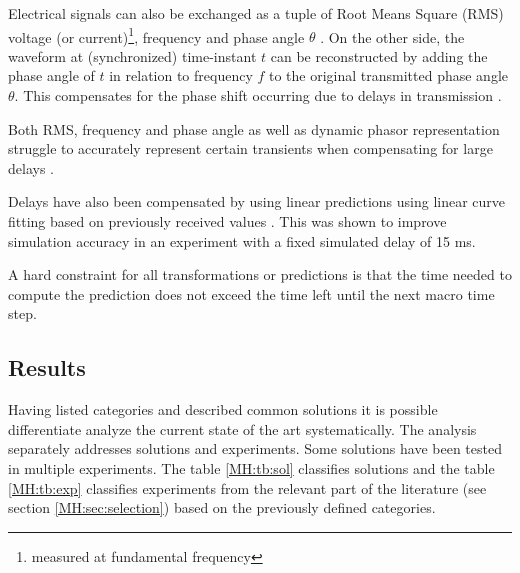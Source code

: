 \documentclass[a4paper,ngerman]{atseminar}
\begin{document}
Electrical signals can also be exchanged as a tuple of Root Means Square (RMS) voltage (or current)\footnote{measured at fundamental frequency}, frequency and phase angle  $\theta$ \cite{stevic2017fidelity}. On the other side, the waveform at (synchronized) time-instant $t$ can be reconstructed by adding the phase angle of $t$ in relation to frequency $f$ to the original transmitted phase angle $\theta$. This compensates for the phase shift occurring due to delays in transmission \cite{stevic2017fidelity}. 


Both RMS, frequency and phase angle as well as dynamic phasor representation struggle to accurately represent certain transients when compensating for large delays \cite{stevic2017fidelity}.


Delays have also been compensated by using linear predictions using linear curve fitting based on previously received values \cite{liu2016}. This was shown to improve simulation accuracy in an experiment with a fixed simulated delay of 15 ms.

A hard constraint for all transformations or predictions is that the time needed to compute the prediction does not exceed the time left until the next macro time step.



\subsection{Results}
\label{MH:sec:results}

Having listed categories and described common solutions it is possible differentiate analyze the current state of the art systematically. The analysis separately addresses solutions and experiments. Some solutions have been tested in multiple experiments. The table \ref{MH:tb:sol} classifies solutions and the table \ref{MH:tb:exp} classifies experiments from the relevant part of the literature (see section \ref{MH:sec:selection}) based on the previously defined categories. 

\newcommand{\citevillas}{stevic2017europe, monti2018}
\end{document}
